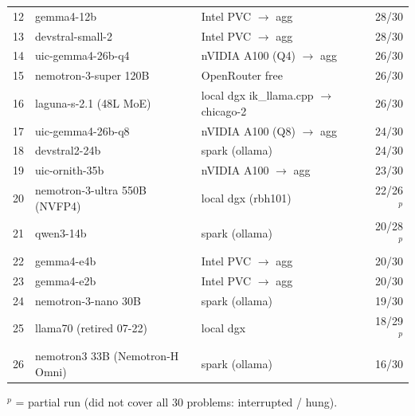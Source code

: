 \begin{table}[t]
\begin{tabular}{rllr}
    12 & gemma4-12b                    & Intel PVC $\to$ agg               & 28/30 \\
    13 & devstral-small-2              & Intel PVC $\to$ agg               & 28/30 \\
    14 & uic-gemma4-26b-q4             & nVIDIA A100 (Q4) $\to$ agg        & 26/30 \\
    15 & nemotron-3-super 120B         & OpenRouter free                   & 26/30 \\
    16 & laguna-s-2.1 (48L MoE)        & local dgx ik\_llama.cpp $\to$ chicago-2 & 26/30 \\
    17 & uic-gemma4-26b-q8             & nVIDIA A100 (Q8) $\to$ agg        & 24/30 \\
    18 & devstral2-24b                 & spark (ollama)                    & 24/30 \\
    19 & uic-ornith-35b                & nVIDIA A100 $\to$ agg             & 23/30 \\
    20 & nemotron-3-ultra 550B (NVFP4) & local dgx (rbh101)                & 22/26$^{p}$ \\
    21 & qwen3-14b                     & spark (ollama)                    & 20/28$^{p}$ \\
    22 & gemma4-e4b                    & Intel PVC $\to$ agg               & 20/30 \\
    23 & gemma4-e2b                    & Intel PVC $\to$ agg               & 20/30 \\
    24 & nemotron-3-nano 30B           & spark (ollama)                    & 19/30 \\
    25 & llama70 (retired 07-22)       & local dgx                         & 18/29$^{p}$ \\
    26 & nemotron3 33B (Nemotron-H Omni) & spark (ollama)                  & 16/30 \\
    \bottomrule
  \end{tabular}

  \vspace{2pt}
  {\footnotesize
   $^{p}$ = partial run (did not cover all 30 problems: interrupted / hung).}
\end{table}

